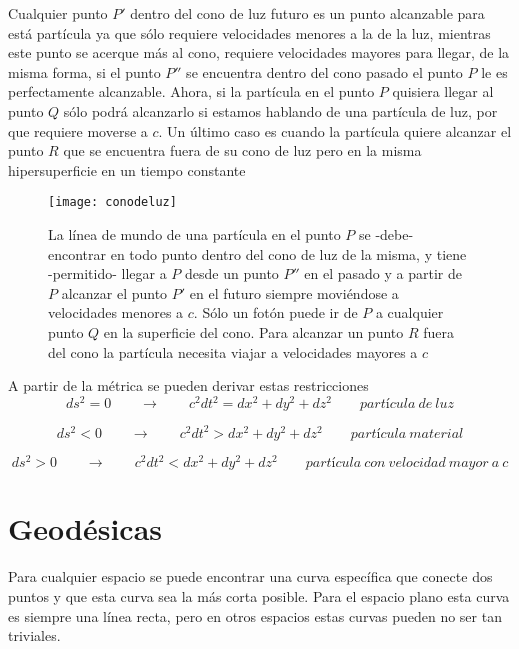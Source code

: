 \documentclass[11pt]{book}
\begin{document}
Cualquier punto $P'$ dentro del cono de luz futuro es un punto alcanzable para está partícula ya que sólo requiere velocidades menores a la de la luz, mientras este punto se acerque más al cono, requiere velocidades mayores para llegar, de la misma forma, si el punto $P''$ se encuentra dentro del cono pasado el punto $P$ le es perfectamente alcanzable.
Ahora, si la partícula en el punto $P$ quisiera llegar al punto $Q$ sólo podrá alcanzarlo si estamos hablando de una partícula de luz, por que requiere moverse a $c$. Un último caso es cuando la partícula quiere alcanzar el punto $R$ que se encuentra fuera de su cono de luz pero en la misma hipersuperficie en un tiempo constante
\begin{figure}[h!]
\centering
\texttt{[image: conodeluz]}
\caption{ La línea de mundo de una partícula en el punto $P$ se -debe- encontrar en todo punto dentro del cono de luz de la misma, y tiene -permitido- llegar a $P$ desde un punto $P''$ en el pasado y a partir de $P$ alcanzar el punto $P'$ en el futuro siempre moviéndose a velocidades menores a $c$. Sólo un fotón puede ir de $P$ a  cualquier punto $Q$ en la superficie del cono. Para alcanzar un punto $R$ fuera del cono la partícula necesita viajar a velocidades mayores a $c$}
\label{conodeluz}
\end{figure}

A partir de la métrica se pueden derivar estas restricciones
\begin{equation} 
ds^2=0 \qquad \to \qquad c^2dt^2=dx^2+dy^2+dz^2 \qquad partícula~ de~ luz 
\end{equation}

\begin{equation}
ds^2<0 \qquad \to \qquad c^2dt^2>dx^2+dy^2+dz^2 \qquad partícula~material
\end{equation}

\begin{equation}
ds^2>0 \qquad \to \qquad c^2dt^2<dx^2+dy^2+dz^2 \qquad partícula~con~velocidad~mayor ~a~c
\end{equation}



\section{Geodésicas}

Para cualquier espacio se puede encontrar una curva específica que conecte dos puntos y que esta curva sea la más corta posible. Para el espacio plano esta curva es siempre una línea recta, pero en otros espacios estas curvas pueden no ser tan triviales.
\end{document}
